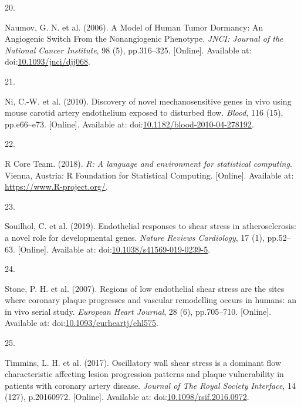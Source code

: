 \documentclass[
  11pt,
]{article}
\newlength{\cslhangindent}
\newlength{\csllabelwidth}
\newlength{\cslentryspacingunit} %
\newenvironment{CSLReferences}[2] %
 {%
  \setlength{\parindent}{0pt}
  \ifodd #1
  \let\oldpar\par
  \def\par{\hangindent=\cslhangindent\oldpar}
  \fi
  \setlength{\parskip}{#2\cslentryspacingunit}
 }%
 {}
\newcommand{\CSLLeftMargin}[1]{\parbox[t]{\csllabelwidth}{#1}}
\newcommand{\CSLRightInline}[1]{\parbox[t]{\linewidth - \csllabelwidth}{#1}\break}
\begin{document}
\begin{CSLReferences}{0}{0}
\leavevmode{}%
\CSLLeftMargin{20. }
\CSLRightInline{Naumov, G. N. {et al.} (2006). {A Model of Human Tumor Dormancy: An Angiogenic Switch From the Nonangiogenic Phenotype}. \emph{JNCI: Journal of the National Cancer Institute}, 98 (5), pp.316--325. {[}Online{]}. Available at: doi:\href{https://doi.org/10.1093/jnci/djj068}{10.1093/jnci/djj068}.}

\leavevmode{}%
\CSLLeftMargin{21. }
\CSLRightInline{Ni, C.-W. {et al.} (2010). {Discovery of novel mechanosensitive genes in vivo using mouse carotid artery endothelium exposed to disturbed flow}. \emph{Blood}, 116 (15), pp.e66--e73. {[}Online{]}. Available at: doi:\href{https://doi.org/10.1182/blood-2010-04-278192}{10.1182/blood-2010-04-278192}.}

\leavevmode{}%
\CSLLeftMargin{22. }
\CSLRightInline{R Core Team. (2018). {\emph{R: A language and environment for statistical computing}}. Vienna, Austria: R Foundation for Statistical Computing. {[}Online{]}. Available at: \url{https://www.R-project.org/}.}

\leavevmode{}%
\CSLLeftMargin{23. }
\CSLRightInline{Souilhol, C. {et al.} (2019). {Endothelial responses to shear stress in atherosclerosis: a novel role for developmental genes}. \emph{Nature Reviews Cardiology}, 17 (1), pp.52--63. {[}Online{]}. Available at: doi:\href{https://doi.org/10.1038/s41569-019-0239-5}{10.1038/s41569-019-0239-5}.}

\leavevmode{}%
\CSLLeftMargin{24. }
\CSLRightInline{Stone, P. H. {et al.} (2007). {Regions of low endothelial shear stress are the sites where coronary plaque progresses and vascular remodelling occurs in humans: an in vivo serial study}. \emph{European Heart Journal}, 28 (6), pp.705--710. {[}Online{]}. Available at: doi:\href{https://doi.org/10.1093/eurheartj/ehl575}{10.1093/eurheartj/ehl575}.}

\leavevmode{}%
\CSLLeftMargin{25. }
\CSLRightInline{Timmins, L. H. {et al.} (2017). {Oscillatory wall shear stress is a dominant flow characteristic affecting lesion progression patterns and plaque vulnerability in patients with coronary artery disease}. \emph{Journal of The Royal Society Interface}, 14 (127), p.20160972. {[}Online{]}. Available at: doi:\href{https://doi.org/10.1098/rsif.2016.0972}{10.1098/rsif.2016.0972}.}


\end{CSLReferences}
\end{document}
